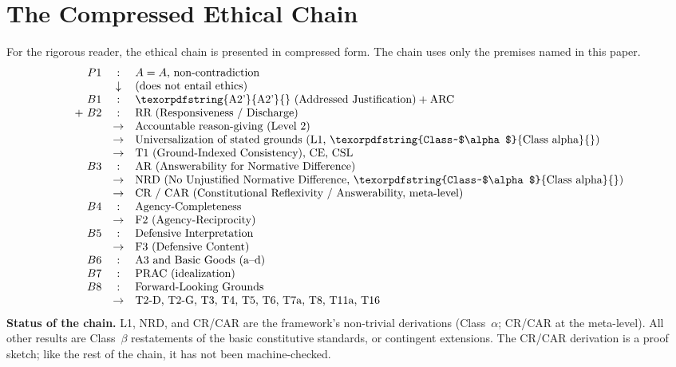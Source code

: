 \documentclass[11pt]{article}
\def\ensuremath#1{#1}%
\def\mathrm#1{#1}%
\newcommand{\Atwo}{\texorpdfstring{\ensuremath{\mathrm{A2}'}}{A2'}}
\newcommand{\ca}{\texorpdfstring{Class~$\alpha$}{Class alpha}}
\newcommand{\cb}{\texorpdfstring{Class~$\beta$}{Class beta}}
\begin{document}
\section{The Compressed Ethical Chain}\label{app:chain}
For the rigorous reader, the ethical chain is presented in compressed form. The chain uses only the premises named in this paper.
\[
\begin{array}{rcl}
\mathrm{P1} & : & A = A \text{, non-contradiction} \\
& \downarrow & \text{(does not entail ethics)} \\
\mathrm{B1} & : & \text{\Atwo{} (Addressed Justification)} + \text{ARC} \\
+\ \mathrm{B2} & : & \text{RR (Responsiveness / Discharge)} \\
& \rightarrow & \text{Accountable reason-giving (Level 2)} \\
& \rightarrow & \text{Universalization of stated grounds (L1, \ca{})} \\
& \rightarrow & \text{T1 (Ground-Indexed Consistency), CE, CSL} \\
\mathrm{B3} & : & \text{AR (Answerability for Normative Difference)} \\
& \rightarrow & \text{NRD (No Unjustified Normative Difference, \ca{})} \\
& \rightarrow & \text{CR / CAR (Constitutional Reflexivity / Answerability, meta-level)} \\
\mathrm{B4} & : & \text{Agency-Completeness} \\
& \rightarrow & \text{F2 (Agency-Reciprocity)} \\
\mathrm{B5} & : & \text{Defensive Interpretation} \\
& \rightarrow & \text{F3 (Defensive Content)} \\
\mathrm{B6} & : & \text{A3 and Basic Goods (a--d)} \\
\mathrm{B7} & : & \text{PRAC (idealization)} \\
\mathrm{B8} & : & \text{Forward-Looking Grounds} \\
& \rightarrow & \text{T2-D, T2-G, T3, T4, T5, T6, T7a, T8, T11a, T16}
\end{array}
\]
\textbf{Status of the chain.} L1, NRD, and CR/CAR are the framework's non-trivial derivations (\ca{}; CR/CAR at the meta-level). All other results are \cb{} restatements of the basic constitutive standards, or contingent extensions. The CR/CAR derivation is a proof sketch; like the rest of the chain, it has not been machine-checked.
\end{document}
